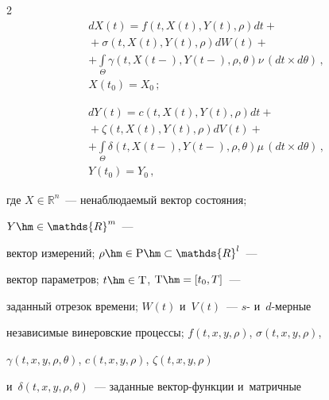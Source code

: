 \begin{multicols}{2}
\begin{multline}
\label{eqItoXJump}

  dX(t) = f \left( t,X(t),Y(t),\rho \right) dt + {}\\

  {}+

  \sigma \left( t,X(t),Y(t),\rho \right) dW(t) + {} \\

  + \int\limits_\Theta \gamma \left( t,X(t-),Y(t-),\rho,\theta \right) 

  \nu\,(dt \times d\theta)\,,\\ X\left(t_0\right) = X_0\,;

\end{multline}



\vspace*{-12pt}



\noindent

\begin{multline}

\label{eqItoYJump}

  dY(t) = c \left( t,X(t),Y(t),\rho \right) dt + {}\\

  {}+

  \zeta \left( t,X(t),Y(t),\rho \right) dV(t) + {} \\

  + \int\limits_\Theta \delta \left( t,X(t-),Y(t-),\rho,\theta \right) \mu\,

  (dt \times d\theta)\,,\\ Y\left(t_0\right) = Y_0\,,

\end{multline}

где $X \in \mathds{R}^n$~--- ненаблюдаемый вектор состояния; 

$Y \hm\in \mathds{R}^m$~--- 

вектор измерений; $\rho \hm\in \mathrm{P} \hm\subset \mathds{R}^l$~--- 

вектор параметров; $t \hm\in \mathrm{T}$, $\mathrm{T}\hm = [t_0,T]$~--- 

заданный отрезок времени; $W(t)$ и~$V(t)$~--- $s$- и~$d$-мер\-ные 

независимые винеровские процессы; $f(t,x,y,\rho)$, $\sigma(t,x,y,\rho)$, 

$\gamma(t,x,y,\rho,\theta)$, $c(t,x,y,\rho)$, $\zeta(t,x,y,\rho)$ 

и~$\delta(t,x,y,\rho,\theta)$~--- заданные век\-тор-функ\-ции и~матричные 


\end{multicols}
